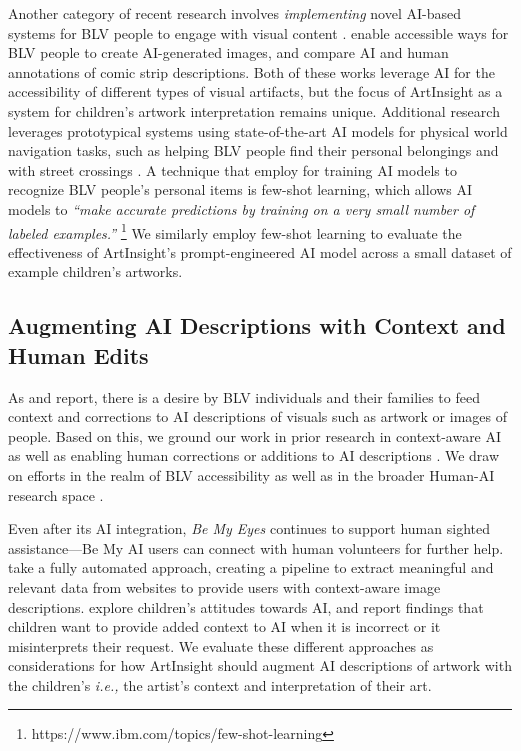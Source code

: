Another category of recent research involves \textit{implementing} novel AI-based systems for BLV people to engage with visual content \cite{Huh_GenAssist, Kim_DescriptionsForComics}. \citet{Huh_GenAssist} enable accessible ways for BLV people to create AI-generated images, and \citet{Kim_DescriptionsForComics} compare AI and human annotations of comic strip descriptions. Both of these works leverage AI for the accessibility of different types of visual artifacts, but the focus of ArtInsight as a system for children's artwork interpretation remains unique. Additional research leverages prototypical systems using state-of-the-art AI models for physical world navigation tasks, such as helping BLV people find their personal belongings \cite{Morrison_FindMyThings} and with street crossings \cite{jain2024streetnavleveragingstreetcameras}. A technique that \citet{Morrison_FindMyThings} employ for training AI models to recognize BLV people's personal items is few-shot learning, which allows AI models to \textit{``make accurate predictions by training on a very small number of labeled examples.''} \footnote{https://www.ibm.com/topics/few-shot-learning} We similarly employ few-shot learning to evaluate the effectiveness of ArtInsight's prompt-engineered AI model across a small dataset of example children's artworks.

\subsection{Augmenting AI Descriptions with Context and Human Edits}
As \citet{chhedakothary2024} and \citet{bennett_itscomplicated} report, there is a desire by BLV individuals and their families to feed context and corrections to AI descriptions of visuals such as artwork or images of people. Based on this, we ground our work in prior research in context-aware AI \cite{Gubbi_ContextAware} as well as enabling human corrections or additions to AI descriptions \cite{be_my_eyes_2024, darth_vader}. We draw on efforts in the realm of BLV accessibility \cite{Lee_RSAs, be_my_eyes_2024, Gubbi_ContextAware, Singh_FigureA11y} as well as in the broader Human-AI research space \cite{darth_vader, hwang_creative}.

Even after its AI integration, \textit{Be My Eyes} continues to support human sighted assistance---Be My AI users can connect with human volunteers for further help. \citet{Gubbi_ContextAware} take a fully automated approach, creating a pipeline to extract meaningful and relevant data from websites to provide users with context-aware image descriptions. \citet{darth_vader} explore children's attitudes towards AI, and report findings that children want to provide added context to AI when it is incorrect or it misinterprets their request. We evaluate these different approaches as considerations for how ArtInsight should augment AI descriptions of artwork with the children's \textit{i.e.,} the artist's context and interpretation of their art.
